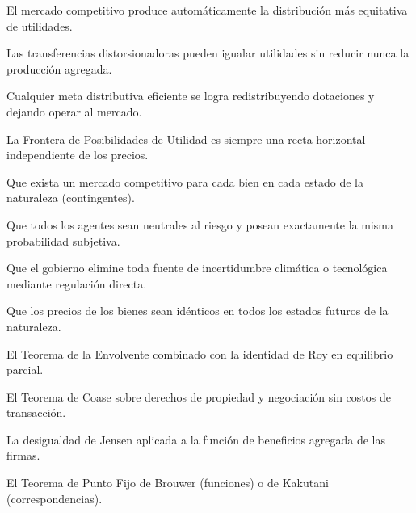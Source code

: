 \begin{opts}
    \item El mercado competitivo produce automáticamente la distribución más equitativa de utilidades.
    \item Las transferencias distorsionadoras pueden igualar utilidades sin reducir nunca la producción agregada.
    \item Cualquier meta distributiva eficiente se logra redistribuyendo dotaciones y dejando operar al mercado.
    \item La Frontera de Posibilidades de Utilidad es siempre una recta horizontal independiente de los precios.
\end{opts}

\begin{opts}
    \item Que exista un mercado competitivo para cada bien en cada estado de la naturaleza (contingentes).
    \item Que todos los agentes sean neutrales al riesgo y posean exactamente la misma probabilidad subjetiva.
    \item Que el gobierno elimine toda fuente de incertidumbre climática o tecnológica mediante regulación directa.
    \item Que los precios de los bienes sean idénticos en todos los estados futuros de la naturaleza.
\end{opts}

\begin{opts}
    \item El Teorema de la Envolvente combinado con la identidad de Roy en equilibrio parcial.
    \item El Teorema de Coase sobre derechos de propiedad y negociación sin costos de transacción.
    \item La desigualdad de Jensen aplicada a la función de beneficios agregada de las firmas.
    \item El Teorema de Punto Fijo de Brouwer (funciones) o de Kakutani (correspondencias).
\end{opts}

